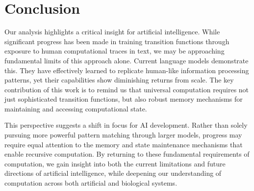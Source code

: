 \documentclass[12pt]{article}
\begin{document}
\section{Conclusion}

Our analysis highlights a critical insight for artificial intelligence.
While significant progress has been made in training transition functions through exposure to human computational traces in text, we may be approaching fundamental limits of this approach alone.
Current language models demonstrate this.
They have effectively learned to replicate human-like information processing patterns, yet their capabilities show diminishing returns from scale.
The key contribution of this work is to remind us that universal computation requires not just sophisticated transition functions, but also robust memory mechanisms for maintaining and accessing computational state.

This perspective suggests a shift in focus for AI development.
Rather than solely pursuing more powerful pattern matching through larger models, progress may require equal attention to the memory and state maintenance mechanisms that enable recursive computation.
By returning to these fundamental requirements of computation, we gain insight into both the current limitations and future directions of artificial intelligence, while deepening our understanding of computation across both artificial and biological systems.

\begingroup
\footnotesize


\endgroup
\end{document}

